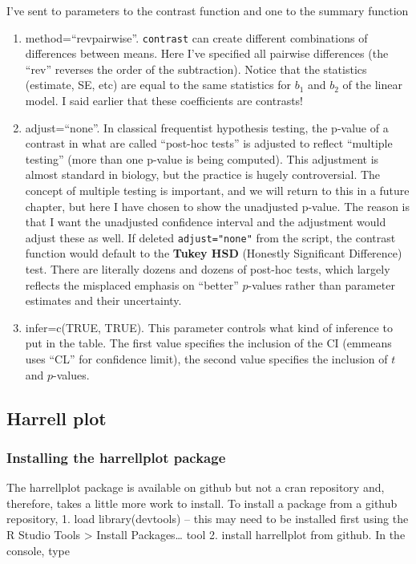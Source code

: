 \documentclass[]{book}
\providecommand{\tightlist}{%
  \setlength{\itemsep}{0pt}\setlength{\parskip}{0pt}}
\theoremstyle{definition}
\theoremstyle{definition}
\theoremstyle{definition}
\theoremstyle{remark}
\begin{document}
I've sent to parameters to the contrast function and one to the summary
function

\begin{enumerate}
\def\labelenumi{\arabic{enumi}.}
\tightlist
\item
  method=``revpairwise''. \texttt{contrast} can create different
  combinations of differences between means. Here I've specified all
  pairwise differences (the ``rev'' reverses the order of the
  subtraction). Notice that the statistics (estimate, SE, etc) are equal
  to the same statistics for \(b_1\) and \(b_2\) of the linear model. I
  said earlier that these coefficients are contrasts!
\item
  adjust=``none''. In classical frequentist hypothesis testing, the
  p-value of a contrast in what are called ``post-hoc tests'' is
  adjusted to reflect ``multiple testing'' (more than one p-value is
  being computed). This adjustment is almost standard in biology, but
  the practice is hugely controversial. The concept of multiple testing
  is important, and we will return to this in a future chapter, but here
  I have chosen to show the unadjusted p-value. The reason is that I
  want the unadjusted confidence interval and the adjustment would
  adjust these as well. If deleted \texttt{adjust="none"} from the
  script, the contrast function would default to the \textbf{Tukey HSD}
  (Honestly Significant Difference) test. There are literally dozens and
  dozens of post-hoc tests, which largely reflects the misplaced
  emphasis on ``better'' \(p\)-values rather than parameter estimates
  and their uncertainty.
\item
  infer=c(TRUE, TRUE). This parameter controls what kind of inference to
  put in the table. The first value specifies the inclusion of the CI
  (emmeans uses ``CL'' for confidence limit), the second value specifies
  the inclusion of \(t\) and \(p\)-values.
\end{enumerate}

\subsection{Harrell plot}\label{harrell-plot}

\subsubsection{Installing the harrellplot
package}\label{installing-the-harrellplot-package}

The harrellplot package is available on github but not a cran repository
and, therefore, takes a little more work to install. To install a
package from a github repository, 1. load library(devtools) -- this may
need to be installed first using the R Studio Tools \textgreater{}
Install Packages\ldots{} tool 2. install harrellplot from github. In the
console, type
\end{document}
